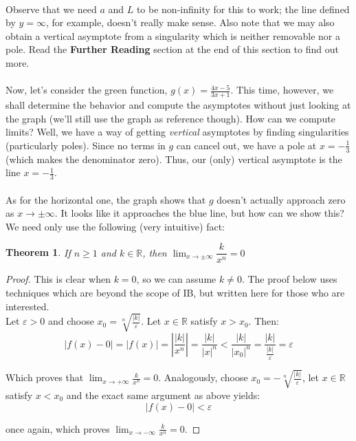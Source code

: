 \documentclass[12pt, a4paper, titlepage, twoside]{article}
\newcommand*{\R}{\mathbb{R}}
\newtheorem*{theorem*}{Theorem}
\begin{document}
	\paragraph{}
	Observe that we need $a$ and $L$ to be non-infinity for this to work; the line defined by $y = \infty$, for example, doesn't really make sense.
	Also note that we may also obtain a vertical asymptote from a singularity which is neither removable nor a pole. Read the \textbf{Further
	Reading} section at the end of this section to find out more. 
	
	\paragraph{}
	Now, let's consider the green function, $g(x) = \frac{4x-5}{3x+1}$. This time, however, we shall determine the behavior and compute the 
	asymptotes without just looking at the graph (we'll still use the graph as reference though). How can we compute limits? Well, we have
	a way of getting \textit{vertical} asymptotes by finding singularities (particularly poles). Since no terms in $g$ can cancel out, we have
	a pole at $x = -\frac{1}{3}$ (which makes the denominator zero). Thus, our (only) vertical asymptote is the line $x = -\frac{1}{3}$.
	
	\paragraph{}
	As for the horizontal one, the graph shows that $g$ doesn't actually approach zero as $x \to \pm \infty$. It looks like it approaches the
	blue line, but how can we show this? We need only use the following (very intuitive) fact:\\
	
	\begin{pf}
		\begin{theorem*}
			If $n \geqslant 1$ and $k \in \R$, then $\displaystyle \lim_{x \to \pm \infty} \dfrac{k}{x^n} = 0$
		\end{theorem*}

		\tcbline		
		
		\begin{proof}
			This is clear when $k=0$, so we can assume $k \neq 0$. The proof below uses techniques which are beyond the scope 
			of IB, but written here for those who are interested.\\
			
			Let $\varepsilon > 0$ and choose $x_0 = \sqrt[n]{\frac{|k|}{\varepsilon}}$. Let $x \in \R$ satisfy $x >x_0$. Then:
			\[ |f(x) - 0| = |f(x)| = \left\vert \dfrac{|k|}{x^n} \right\vert = \dfrac{|k|}{|x|^n} < \dfrac{|k|}{|x_0|^n} = \dfrac{|k|}{\tfrac{|k|}
			{\varepsilon}} = \varepsilon \]
			
			Which proves that $\displaystyle \lim_{x \to +\infty} \frac{k}{x^n} = 0$. Analogously, choose $x_0 = -\sqrt[n]{\frac{|k|}{\varepsilon}}$,
			let $x \in \R$ satisfy $x < x_0$ and the exact same argument as above yields:
			\[ |f(x) - 0| < \varepsilon \]
			
			once again, which proves $\displaystyle \lim_{x \to -\infty} \frac{k}{x^n} = 0$.
		\end{proof}
	\end{pf}
	
\end{document}
